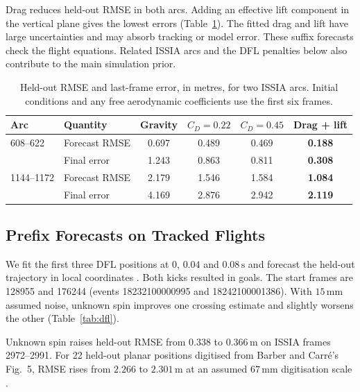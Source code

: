 \documentclass[11pt,a4paper]{article}
\begin{document}
Drag reduces held-out RMSE in both arcs. Adding an effective lift component in the vertical plane gives the lowest errors (Table~\ref{tab:issia}). The fitted drag and lift have large uncertainties and may absorb tracking or model error. These suffix forecasts check the flight equations. Related ISSIA arcs and the DFL penalties below also contribute to the main simulation prior.

\begin{table}[htbp]
  \centering
  \caption{Held-out RMSE and last-frame error, in metres, for two ISSIA arcs. Initial conditions and any free aerodynamic coefficients use the first six frames.}
  \label{tab:issia}
  \begin{tabular}{llcccc}
    \toprule
    Arc & Quantity & Gravity & $C_D=0.22$ & $C_D=0.45$ & Drag + lift \\
    \midrule
    608--622 & Forecast RMSE & 0.697 & 0.489 & 0.469 & \textbf{0.188} \\
             & Final error   & 1.243 & 0.863 & 0.811 & \textbf{0.308} \\
    1144--1172 & Forecast RMSE & 2.179 & 1.546 & 1.584 & \textbf{1.084} \\
               & Final error   & 4.169 & 2.876 & 2.942 & \textbf{2.119} \\
    \bottomrule
  \end{tabular}
\end{table}

\subsection{Prefix Forecasts on Tracked Flights}
\label{sec:dfl}

We fit the first three DFL positions at $0$, $0.04$ and $0.08\,\mathrm{s}$ and forecast the held-out trajectory in local coordinates \cite{dfl2025}. Both kicks resulted in goals. The start frames are 128955 and 176244 (events 18232100000995 and 18242100001386). With $15\,\mathrm{mm}$ assumed noise, unknown spin improves one crossing estimate and slightly worsens the other (Table~\ref{tab:dfl}).

Unknown spin raises held-out RMSE from $0.338$ to $0.366\,\mathrm{m}$ on ISSIA frames 2972--2991. For 22 held-out planar positions digitised from Barber and Carr\'e's Fig.~5, RMSE rises from $2.266$ to $2.301\,\mathrm{m}$ at an assumed $67\,\mathrm{mm}$ digitisation scale \cite{barber2010}.
\end{document}

